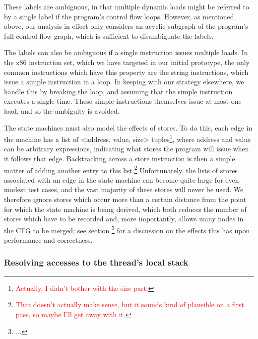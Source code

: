 \documentclass[10pt,twocolumn,preprint,natbib,authoryear]{sigplanconf}
\newcommand{\editorial}[1]{\textcolor{red}{\footnote{\textcolor{red}{#1}}}}
\begin{document}
These labels are ambiguous, in that multiple dynamic loads might be
referred to by a single label if the program's control flow loops.
However, as mentioned above, our analysis in effect only considers an
acyclic subgraph of the program's full control flow graph, which is
sufficient to disambiguate the labels.

The labels can also be ambiguous if a single instruction issues
multiple loads.  In the x86 instruction set, which we have targeted in
our initial prototype, the only common instructions which have this
property are the string instructions, which issue a simple instruction
in a loop.  In keeping with our strategy elsewhere, we handle this by
breaking the loop, and assuming that the simple instruction executes a
single time.  These simple instructions themselves issue at most one
load, and so the ambiguity is avoided.

The state machines must also model the effects of stores.  To do this,
each edge in the machine has a list of <address, value, size>
tuples\editorial{Actually, I didn't bother with the size part.}, where
address and value can be arbitrary expressions, indicating what stores
the program will issue when it follows that edge.  Backtracking across
a store instruction is then a simple matter of adding another entry to
this list.\editorial{That doesn't actually make sense, but it sounds
  kind of plausible on a first pass, so maybe I'll get away with it.}
Unfortunately, the lists of stores associated with an edge in the
state machine can become quite large for even modest test cases, and
the vast majority of these stores will never be used.  We therefore
ignore stores which occur more than a certain distance from the point
for which the state machine is being derived, which both reduces the
number of stores which have to be recorded and, more importantly,
allows many nodes in the CFG to be merged; see section \editorial{...}
for a discussion on the effects this has upon performance and
correctness.

\subsubsection{Resolving accesses to the thread's local stack}
\end{document}
